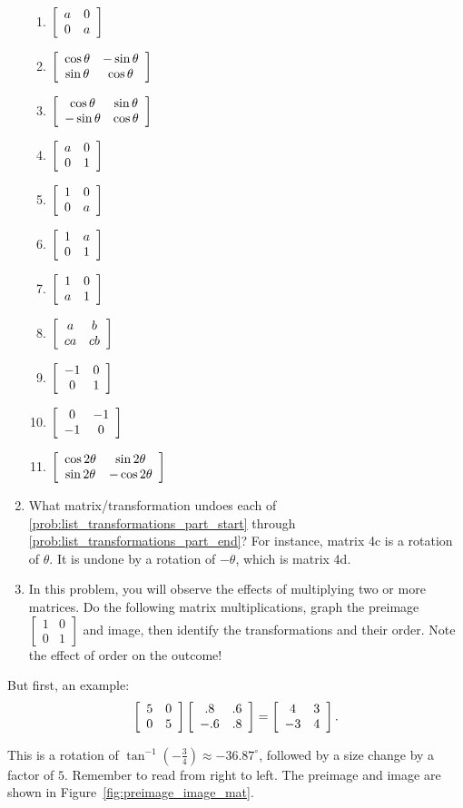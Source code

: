 \documentclass[../gatm.tex]{subfiles}
\begin{document}
\begin{enumerate}
\begin{multicols}{3}
\begin{enumerate}
\item $\left[\begin{array}{cc} a & 0 \\ 0 & a \end{array}\right]$
\item $\left[\begin{array}{cc} \cos\theta & -\sin\theta \\ \sin\theta & \cos\theta \end{array}\right]$
\item $\left[\begin{array}{cc} \cos\theta & \sin\theta \\ -\sin\theta & \cos\theta \end{array}\right]$
\item $\left[\begin{array}{cc} a & 0 \\ 0 & 1 \end{array}\right]$
\item $\left[\begin{array}{cc} 1 & 0 \\ 0 & a \end{array}\right]$
\item $\left[\begin{array}{cc} 1 & a \\ 0 & 1 \end{array}\right]$
\item $\left[\begin{array}{cc} 1 & 0 \\ a & 1 \end{array}\right]$
\item $\left[\begin{array}{cc} a & b \\ ca & cb \end{array}\right]$
\item $\left[\begin{array}{cc} -1 & 0 \\ 0 & 1 \end{array}\right]$ \label{prob:highlighted_example_list_transformations1}
\item $\left[\begin{array}{cc} 0 & -1 \\ -1 & 0 \end{array}\right]$ \label{prob:highlighted_example_list_transformations2}
\item $\left[\begin{array}{cc} \cos 2\theta & \sin 2\theta \\ \sin 2\theta & -\cos 2\theta \end{array}\right]$ \label{prob:list_transformations_part_end}
\end{enumerate}
\end{multicols}
\item What matrix/transformation undoes each of \ref{prob:list_transformations_part_start} through \ref{prob:list_transformations_part_end}? For instance, matrix 4c is a rotation of $\theta$. It is undone by a rotation of $-\theta$, which is matrix 4d.
\item In this problem, you will observe the effects of multiplying two or more matrices. Do the following matrix multiplications, graph the preimage $\left[\begin{array}{cc}1 & 0 \\ 0 & 1\end{array}\right]$ and image, then identify the transformations and their order. Note the effect of order on the outcome!
\setcounter{bruh_count}{\value{enumi}}
\end{enumerate}

\noindent But first, an example:
$$\left[\begin{array}{cc} 5 & 0 \\ 0 & 5 \end{array}\right]\left[\begin{array}{cc} .8 & .6 \\ -.6 & .8 \end{array}\right]=\left[\begin{array}{cc} 4 & 3 \\ -3 & 4 \end{array}\right].$$

\noindent This is a rotation of $\tan^{-1}\left(-\frac{3}{4}\right)\approx-36.87^\circ$, followed by a size change by a factor of $5$. Remember to read from right to left. The preimage and image are shown in Figure~\ref{fig:preimage_image_mat}.

\end{document}
